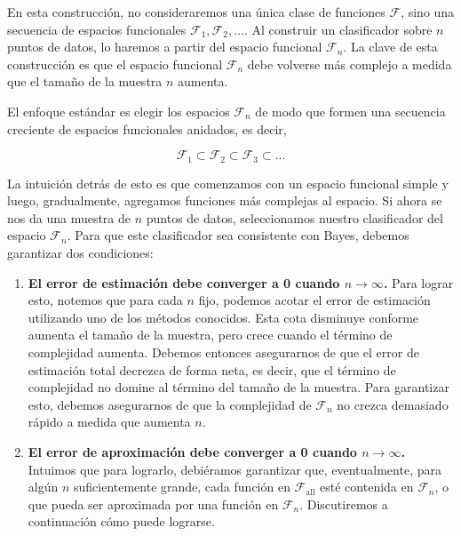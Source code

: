 \documentclass{report}
\begin{document}
En esta construcción, no consideraremos una única clase de funciones \(\mathcal{F}\), sino una 
secuencia de espacios funcionales \(\mathcal{F}_1, \mathcal{F}_2, \dots\). Al construir un 
clasificador sobre \(n\) puntos de datos, lo haremos a partir del espacio funcional \(\mathcal{F}_n\). 
La clave de esta construcción es que el espacio funcional \(\mathcal{F}_n\) debe volverse más 
complejo a medida que el tamaño de la muestra \(n\) aumenta.\newline

El enfoque estándar es elegir los espacios \(\mathcal{F}_n\) de modo que formen una secuencia 
creciente de espacios funcionales anidados, es decir,

\[
\mathcal{F}_1 \subset \mathcal{F}_2 \subset \mathcal{F}_3 \subset \dots
\]

La intuición detrás de esto es que comenzamos con un espacio funcional simple y luego, 
gradualmente, agregamos funciones más complejas al espacio. Si ahora se nos da una muestra 
de \(n\) puntos de datos, seleccionamos nuestro clasificador del espacio \(\mathcal{F}_n\). 
Para que este clasificador sea consistente con Bayes, debemos garantizar dos condiciones:\newline

\begin{enumerate}
    \item \textbf{El error de estimación debe converger a 0 cuando \(n \to \infty\).} Para lograr esto, 
    notemos que para cada \(n\) fijo, podemos acotar el error de estimación utilizando uno de los 
    métodos conocidos. Esta cota disminuye conforme aumenta el tamaño de la muestra, pero 
    crece cuando el término de complejidad aumenta. Debemos entonces asegurarnos de que el error de 
    estimación total decrezca de forma neta, es decir, que el término de complejidad no domine al término 
    del tamaño de la muestra. Para garantizar esto, debemos asegurarnos de que la complejidad de 
    \(\mathcal{F}_n\) no crezca demasiado rápido a medida que aumenta \(n\).

    \item \textbf{El error de aproximación debe converger a 0 cuando \(n \to \infty\).} Intuimos que 
    para lograrlo, 
    debiéramos garantizar que, eventualmente, para algún \(n\) suficientemente grande, cada función en 
    \(\mathcal{F}_{\text{all}}\) esté contenida en \(\mathcal{F}_n\), o que pueda ser aproximada por 
    una función en \(\mathcal{F}_n\). Discutiremos a continuación cómo puede lograrse.
\end{enumerate}
\end{document}
